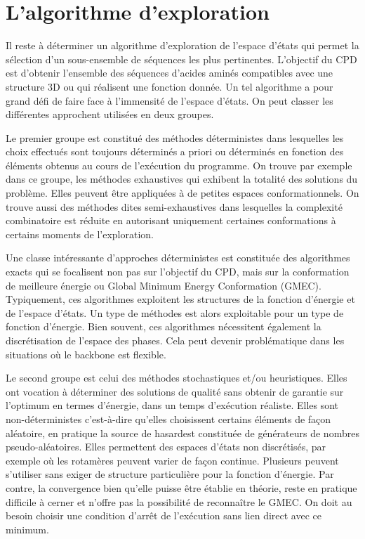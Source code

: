 \section{L'algorithme d'exploration}

Il reste à déterminer un algorithme d'exploration de l'espace d'états qui permet la sélection d'un sous-ensemble de séquences les plus pertinentes. L'objectif du CPD est d'obtenir l'ensemble des séquences d'acides aminés compatibles avec une structure 3D ou qui réalisent une fonction donnée. Un tel algorithme a pour grand défi de faire face à l'immensité de l'espace d'états. On peut classer les différentes approchent utilisées en deux groupes.

Le premier groupe est constitué des méthodes déterministes dans lesquelles les choix effectués sont toujours déterminés a priori ou déterminés en fonction des éléments obtenus au cours de l'exécution du programme. On trouve par exemple dans ce groupe, les méthodes exhaustives qui exhibent la totalité des solutions du problème. Elles peuvent être appliquées à de petites espaces conformationnels. On trouve aussi des méthodes dites semi-exhaustives dans lesquelles la complexité combinatoire est réduite en autorisant uniquement certaines conformations à certains moments de l'exploration.

Une classe intéressante d'approches déterministes est constituée des algorithmes exacts qui se focalisent non pas sur l'objectif du CPD, mais sur la conformation de meilleure énergie ou \og Global Minimum Energy Conformation \fg (GMEC). Typiquement, ces algorithmes exploitent les structures de la fonction d'énergie et de l'espace d'états. Un type de méthodes est alors exploitable pour un type de fonction d'énergie. Bien souvent, ces algorithmes nécessitent également la discrétisation de l'espace des phases. Cela peut devenir problématique dans les situations où le backbone est flexible.
  
Le second groupe est celui des méthodes stochastiques et/ou heuristiques. Elles ont vocation à déterminer des solutions de qualité sans obtenir de garantie sur l'optimum en termes d'énergie, dans un temps d'exécution réaliste. Elles sont non-déterministes c'est-à-dire qu'elles choisissent certains éléments de façon aléatoire, en pratique la \og source de hasard\fg est constituée de générateurs de nombres pseudo-aléatoires. Elles permettent des espaces d'états non discrétisés, par exemple \cite{Perry12} où les rotamères peuvent varier de façon continue. Plusieurs peuvent s'utiliser sans exiger de structure particulière pour la fonction d'énergie. Par contre, la convergence bien qu'elle puisse être établie en théorie, reste en pratique difficile à cerner et n'offre pas la possibilité de reconnaître le GMEC. On doit au besoin choisir une condition d'arrêt de l'exécution sans lien direct avec ce minimum.  

